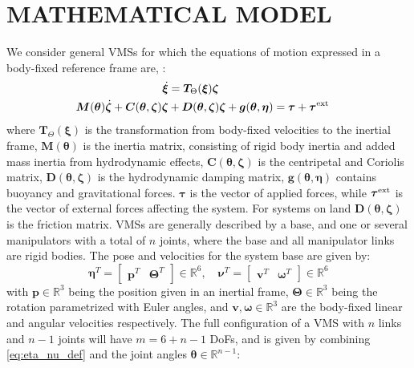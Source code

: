 \documentclass[../main.tex]{subfiles}
\begin{document}
\section{MATHEMATICAL MODEL}
\label{sec:modelling}
We consider general VMSs for which the equations of motion expressed in a body-fixed reference frame are, \cite{From2014}:
\begin{subequations}
    \label{eq:UVMS_equation_body}
    \begin{flalign}
        \dot{\bm{\xi}} &= \bm{T}_\Theta(\bm{\xi})\bm{\zeta} &&\\
        \bm{M}(\bm{\theta}) \dot{\bm{\zeta}} +
        \bm{C}(\bm{\theta}, \bm{\zeta}) \bm{\zeta} &+
        \bm{D}(\bm{\theta},\bm{\zeta}) \bm{\zeta} +
        \bm{g}(\bm{\theta}, \bm{\eta})
        = \bm{\tau} + \bm{\tau}^{\rm ext} && \raisetag{\normalbaselineskip}
    \end{flalign}
\end{subequations}
where $\bm{T}_{\Theta}(\bm{\xi})$ is the transformation from body-fixed velocities to the inertial frame, $\bm{M(\bm{\theta})}$ is the inertia matrix, consisting of rigid body inertia and added mass inertia from hydrodynamic effects, $\bm{C}(\bm{\theta}, \bm{\zeta})$ is the centripetal and Coriolis matrix, $\bm{D}(\bm{\theta}, \bm{\zeta})$ is the hydrodynamic damping matrix, $\bm{g}(\bm{\theta},\bm{\eta})$ contains buoyancy and gravitational forces. $\bm{\tau}$ is the vector of applied forces, while $\bm{\tau}^{\rm ext}$ is the vector of external forces affecting the system. For systems on land $\bm{D}(\bm{\theta}, \bm{\zeta})$ is the friction matrix. VMSs are generally described by a base, and one or several manipulators with a total of $n$ joints, where the base and all manipulator links are rigid bodies. The pose and velocities for the system base are given by:
\begin{equation}
    \label{eq:eta_nu_def}
    \bm{\eta}^T = \begin{bmatrix}
    \bm{p}^T & \bm{\Theta}^T
    \end{bmatrix} \in \mathbb{R}^{6},
    \quad
    \bm{\nu}^T = \begin{bmatrix}
        \bm{v}^T & \bm{\bm{\omega}}^T
    \end{bmatrix} \in \mathbb{R}^{6}
\end{equation}
with $\bm{p} \in \mathbb{R}^3$ being the position given in an inertial frame, $\bm{\Theta} \in \mathbb{R}^3$ being the rotation parametrized with Euler angles, and $\bm{v}, \bm{\bm{\omega}} \in \mathbb{R}^3$ are the body-fixed linear and angular velocities respectively. The full configuration of a VMS with $n$ links and $n-1$ joints will have $m = 6 + n - 1$ DoFs, and is given by combining \eqref{eq:eta_nu_def} and the joint angles $\bm{\theta} \in \mathbb{R}^{n-1}$:
\end{document}
